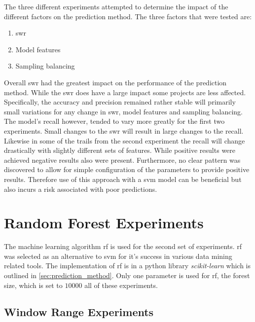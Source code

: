 The three different experiments attempted to determine the impact of the different factors on the prediction method. The three factors that were tested are:
\begin{enumerate}
\item \gls{swr}
\item Model features
\item Sampling balancing
\end{enumerate}
Overall \gls{swr} had the greatest impact on the performance of the prediction method. While the \gls{swr} does have a large impact some projects are less affected. Specifically, the accuracy and precision remained rather stable will primarily small variations for any change in \gls{swr}, model features and sampling balancing. The model's recall however, tended to vary more greatly for the first two experiments. Small changes to the \gls{swr} will result in large changes to the recall. Likewise in some of the trails from the second experiment the recall will change drastically with slightly different sets of features. While positive results were achieved negative results also were present. Furthermore, no clear pattern was discovered to allow for simple configuration of the parameters to provide positive results. Therefore use of this approach with a \gls{svm} model can be beneficial but also incurs a risk associated with poor predictions.   

\section{Random Forest Experiments}
\label{sec:rf_experiments}

The machine learning algorithm \gls{rf} is used for the second set of experiments. \gls{rf} was selected as an alternative to \gls{svm} for it's success in various data mining related tools. The implementation of \gls{rf} is in a python library \textit{scikit-learn} which is outlined in \autoref{sec:prediction_method}. Only one parameter is used for \gls{rf}, the forest size, which is set to $10000$ all of these experiments.

\subsection{Window Range Experiments}
\label{sec:rf_swr_experiment}

